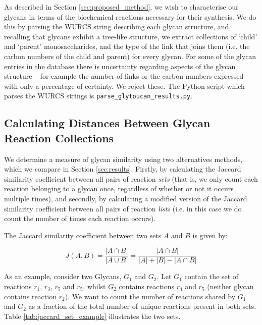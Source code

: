 \documentclass[12pt,a4paper]{article}
\begin{document}
As described in Section \ref{sec:proposed_method}, we wish to characterise our glycans in terms of the biochemical reactions necessary for their synthesis. We do this by parsing the WURCS string describing each glycan structure, and, recalling that glycans exhibit a tree-like structure, we extract collections of `child' and `parent' monosaccharides, and the type of the link that joins them (i.e. the carbon numbers of the child and parent) for every glycan. For some of the glycan entries in the database there is uncertainty regarding aspects of the glycan structure -- for example the number of links or the carbon numbers expressed with only a percentage of certainty. We reject these. The Python script which parses the WURCS strings is \texttt{parse\_glytoucan\_results.py}.


\subsection{Calculating Distances Between Glycan Reaction Collections}
\label{sec:distance_calc_set}

We determine a measure of glycan similarity using two alternatives methods, which we compare in Section \ref{sec:results}. Firstly, by calculating the Jaccard similarity coefficient between all pairs of reaction \emph{sets} (that is, we only count each reaction belonging to a glycan once, regardless of whether or not it occurs multiple times), and secondly, by calculating a modified version of the Jaccard similarity coefficient between all pairs of reaction \emph{lists} (i.e. in this case we do count the number of times each reaction occurs).

The Jaccard similarity coefficient between two sets $A$ and $B$ is given by:

\begin{equation}
\label{eq:precall}
	J(A,B)=\frac{|A \cap B|}{|A \cup B|}=\frac{|A \cap B|}{|A|+|B|-|A \cap B|}
\end{equation}

As an example, consider two Glycans, $G_1$ and $G_2$. Let $G_1$ contain the set of reactions $r_1$, $r_3$, $r_5$ and $r_5$, whilst $G_2$ contains reactions $r_4$ and $r_5$ (neither glycan contains reaction $r_2$). We want to count the number of reactions shared by $G_1$ and $G_2$ as a fraction of the total number of unique reactions present in both sets. Table \ref{tab:jaccard_set_example} illustrates the two sets.
\end{document}
